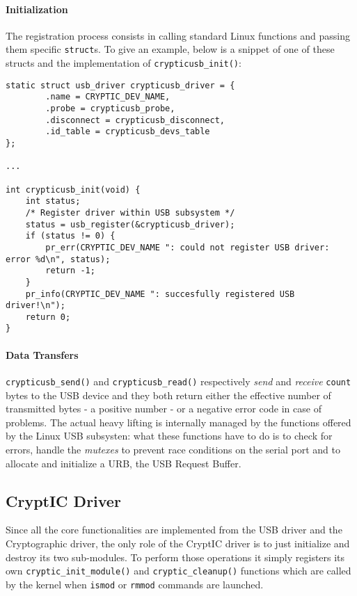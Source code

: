 \paragraph{Initialization} The registration process consists in calling standard Linux functions and passing them specific \texttt{struct}s. To give an example, below is a snippet of one of these structs and the implementation of \texttt{crypticusb\_init()}:
\begin{lstlisting}
static struct usb_driver crypticusb_driver = {
        .name = CRYPTIC_DEV_NAME,
        .probe = crypticusb_probe,
        .disconnect = crypticusb_disconnect,
        .id_table = crypticusb_devs_table
};

...

int crypticusb_init(void) {
    int status;
    /* Register driver within USB subsystem */
    status = usb_register(&crypticusb_driver);
    if (status != 0) {
        pr_err(CRYPTIC_DEV_NAME ": could not register USB driver: error %d\n", status);
        return -1;
    }
    pr_info(CRYPTIC_DEV_NAME ": succesfully registered USB driver!\n");
    return 0;
}
\end{lstlisting}

\paragraph{Data Transfers} \texttt{crypticusb\_send()} and \texttt{crypticusb\_read()} respectively \emph{send} and \emph{receive} \texttt{count} bytes to the USB device and they both return either the effective number of transmitted bytes - a positive number - or a negative error code in case of problems. The actual heavy lifting is internally managed by the functions offered by the Linux USB subsysten: what these functions have to do is to check for errors, handle the \textit{mutexes} to prevent race conditions on the serial port and to allocate and initialize a URB, the USB Request Buffer.

\subsection{CryptIC Driver}
Since all the core functionalities are implemented from the USB driver and the Cryptographic driver, the only role of the CryptIC driver is to just initialize and destroy its two sub-modules. To perform those operations it simply registers its own \texttt{cryptic\_init\_module()} and \texttt{cryptic\_cleanup()} functions which are called by the kernel when \texttt{ismod} or \texttt{rmmod} commands are launched.

